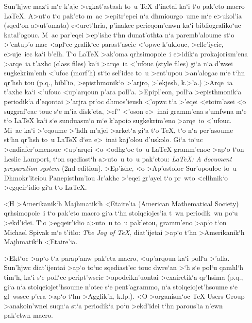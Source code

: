 Sun'hjwc maz`i m`e k'aje >egkat'astash to~u {\rm\TeX} d'inetai ka`i t`o
pak'eto {\rm macro \LaTeX\null}.  A>ut`o t`o pak'eto m~ac >epitr'epei
n`a dhmiourgo~ume m`e e>ukol'ia (sqed`on a>ut'omata) e<uret'hria,
p'inakec perieqom'enwn ka`i bibliografiko`uc katal'ogouc.  M~ac par'eqei
>ep'ishc t`hn dunat'othta n`a paremb'aloume st`o >'entup'o mac <apl`ec
grafik`ec parast'aseic <'opwc k'uklouc, >elle'iyeic, e>uje~iec ka`i
b'elh.  T`o {\rm\LaTeX} >ak'oma qrhsimopoie~i e>idik`a prokajorism'ena
{\tengs >arqe~ia t'axhc\/} ({\rm class files}) ka`i {\tengs >arqe~ia
<'ufouc\/} ({\rm style files}) gi`a n`a d'wsei sugkekrim'enh <'ufoc
(morf'h) st`ic sel'idec to~u >ent'upou >an'alogac m`e t`hn qr'hsh tou
(p.q., bibl'io, >episthmonik`o >'arjro, >'ekjesh, k.>'a.)  >Arqe~ia
t'axhc ka`i <'ufouc <up'arqoun p'ara poll'a.  >Epipl'eon, poll`a
>episthmonik`a periodik`a d'eqontai >'arjra pr`oc dhmos'ieush <'opwc t`a
>'eqei <etoim'asei <o suggraf'eac touc s`e m'ia disk'eta, >ef'' <'oson
e>~inai gramm'ena s'umfwna m`e t`o {\rm\LaTeX} ka`i s`e sunduasm`o m`e
k'apoio sugkekrim'eno >arqe~io <'ufouc.  Mi~ac ka`i >'eqoume >'hdh
m'ajei >arket`a gi`a t`o {\rm\TeX}, t`o n`a per'asoume st`hn qr'hsh to~u
{\rm\LaTeX} d`en e>~inai kaj'olou d'uskolo.  Gi`a to`uc
>endiafer'omenouc <up'arqei <o <odhg`oc to~u {\rm \LaTeX} gramm'enoc
>ap`o t`on {\rm Leslie Lamport}, t`on sqediast`h a>uto~u to~u pak'etou:
{\sl \LaTeX: A document preparation system} ({\rm 2nd
edition}).  >Ep'ishc, <o >Ap'ostoloc Sur'opouloc to~u
Dhmokr'iteiou Panepisthm'iou Jr'akhc >'eqei gr'ayei t`o pr~wto
<ellhnik`o >egqeir'idio gi`a t`o {\rm\LaTeX}.

<H >Amerikanik`h Majhmatik`h <Etaire'ia ({\rm American Mathematical
Society}) qrhsimopoie~i t`o pak'eto {\rm macro \AMSTeX}  gi`a t`hn
stoiqeiojes'ia t~wn periodik~wn po`u >ekd'idei.  T`o >egqeir'idio
a>uto~u to~u pak'etou, gramm'eno >ap`o t`on {\rm Michael Spivak} m`e
t'itlo: {\sl The Joy of \TeX}, diat'ijetai >ap`o t`hn
>Amerikanik`h Majhmatik`h <Etaire'ia. 

>Ekt`oc >ap`o t`a parap'anw pak'eta {\rm macro}, <up'arqoun ka`i poll`a
>'alla.  Sun'hjwc diat'ijentai >ap`o to`uc sqediast'ec touc dwre`an >`h
s`e pol`u qamhl`h tim'h, ka`i s`e poll`ec peript'wseic
>apodei\-kn'u\-ontai >exairetik`a qr'hsima (p.q., gi`a n`a
stoiqeiojet'hsoume n'otec s`e pent'agrammo, n`a stoiqeiojet'hsoume s`e
gl~wssec p'era >ap`o t`hn >Agglik'h, k.lp.).  <O >organism`oc {\rm \TeX{}
Users Group} >anakoin'wnei suqn`a st`a periodik`a po`u >ekd'idei t`hn
parous'ia n'ewn pak'etwn {\rm macro}.

